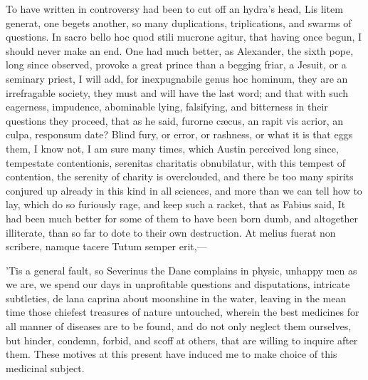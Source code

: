 {To have written in controversy had been to cut off an hydra's head,
Lis litem generat, one begets another, so many duplications,
triplications, and swarms of questions. In sacro bello hoc quod stili
mucrone agitur, that having once begun, I should never make an end. One
had much better, as Alexander, the sixth pope, long since
observed, provoke a great prince than a begging friar, a Jesuit, or a
seminary priest, I will add, for inexpugnabile genus hoc hominum, they
are an irrefragable society, they must and will have the last word; and
that with such eagerness, impudence, abominable lying, falsifying, and
bitterness in their questions they proceed, that as he said,
furorne c\ae{}cus, an rapit vis acrior, an culpa, responsum date? Blind
fury, or error, or rashness, or what it is that eggs them, I know not,
I am sure many times, which Austin perceived long since,
tempestate contentionis, serenitas charitatis obnubilatur, with this
tempest of contention, the serenity of charity is overclouded, and
there be too many spirits conjured up already in this kind in all
sciences, and more than we can tell how to lay, which do so furiously
rage, and keep such a racket, that as Fabius said, It had been
much better for some of them to have been born dumb, and altogether
illiterate, than so far to dote to their own destruction.
At melius fuerat non scribere, namque tacere
Tutum semper erit,---

'Tis a general fault, so Severinus the Dane complains in physic,
unhappy men as we are, we spend our days in unprofitable questions and
disputations, intricate subtleties, de lana caprina about moonshine in
the water, leaving in the mean time those chiefest treasures of nature
untouched, wherein the best medicines for all manner of diseases are to
be found, and do not only neglect them ourselves, but hinder, condemn,
forbid, and scoff at others, that are willing to inquire after them.
These motives at this present have induced me to make choice of this
medicinal subject.

}
